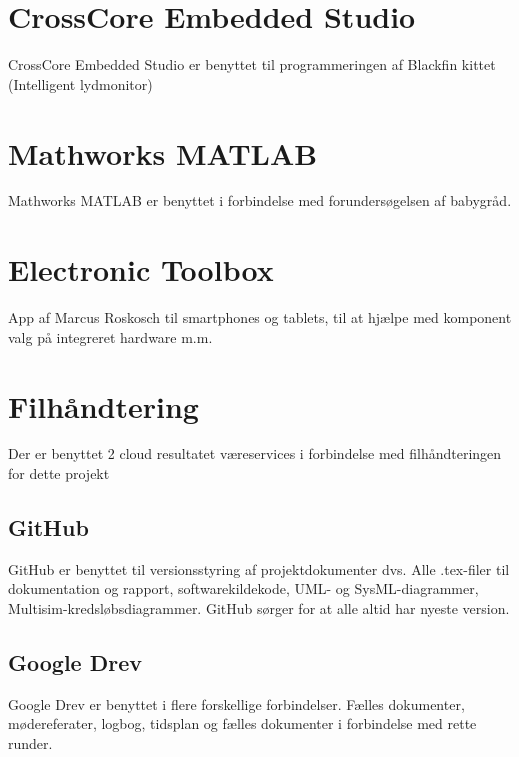 \section*{CrossCore Embedded Studio}
CrossCore Embedded Studio er benyttet til programmeringen af Blackfin kittet (Intelligent lydmonitor)

\section*{Mathworks MATLAB}
Mathworks MATLAB er benyttet i forbindelse med forundersøgelsen af babygråd. 

\section*{Electronic Toolbox}
App af Marcus Roskosch til smartphones og tablets, til at hjælpe med komponent valg på integreret hardware m.m. 

\section*{Filhåndtering}
Der er benyttet 2 cloud resultatet væreservices i forbindelse med filhåndteringen for dette projekt

\subsection*{GitHub}
GitHub er benyttet til versionsstyring af projektdokumenter dvs. Alle .tex-filer til dokumentation og rapport, softwarekildekode, UML- og SysML-diagrammer, Multisim-kredsløbsdiagrammer. GitHub sørger for at alle altid har nyeste version. 

\subsection*{Google Drev}
Google Drev er benyttet i flere forskellige forbindelser. Fælles dokumenter, mødereferater, logbog, tidsplan og fælles dokumenter i forbindelse med rette runder.